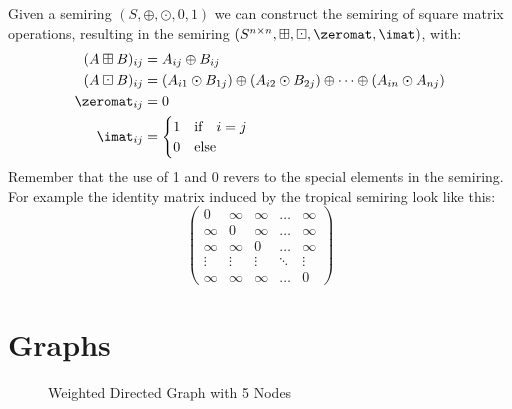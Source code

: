 Given a semiring $(S, \oplus, \odot, 0, 1)$ we can construct the semiring of square matrix operations, resulting in the semiring $(S^{n \times n}, \boxplus, \boxdot, \zeromat, \imat)$, with:
\begin{align*}
    (A \boxplus B)_{ij} &= A_{ij} \oplus B_{ij}\\
    (A \boxdot B)_{ij} &= (A_{i1} \odot B_{1j}) \oplus (A_{i2} \odot B_{2j}) \oplus \dots \oplus (A_{in} \odot A_{nj})\\
    \zeromat_{ij} &= 0\\
    \imat_{ij} &= \begin{cases}
        1 &\textrm{if}\quad i = j\\
        0 &\textrm{else}
    \end{cases}
\end{align*}
Remember that the use of 1 and 0 revers to the special elements in the semiring. For example the identity matrix induced by the tropical semiring look like this:
$$
\left(
\begin{matrix}
    0 & \infty & \infty & \dots & \infty\\
    \infty & 0 & \infty & \dots & \infty\\
    \infty & \infty & 0 & \dots & \infty\\
    \vdots & \vdots & \vdots & \ddots & \vdots\\
    \infty & \infty & \infty & \dots & 0
\end{matrix}
\right)
$$
\section{Graphs}
\begin{figure}[ht]
    \centering
    \caption{Weighted Directed Graph with 5 Nodes}
\end{figure}

